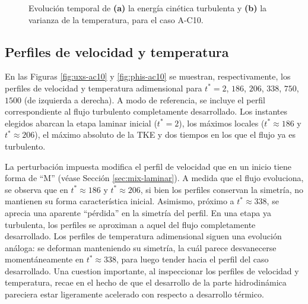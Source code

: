 \begin{figure}[H]
  \centering  
    
  \caption{Evolución temporal de \textbf{(a)} la energía cinética turbulenta y \textbf{(b)} la varianza de la temperatura, para el caso A-C10.}
  \label{fig:ac10-2}
\end{figure}

\subsection{Perfiles de velocidad y temperatura}

En las Figuras \ref{fig:uxs-ac10} y \ref{fig:phis-ac10} se muestran, respectivamente, los perfiles de velocidad y temperatura adimensional para $t^*=2$, $186$, $206$, $338$, $750$, $1500$ (de izquierda a derecha). A modo de referencia, se incluye el perfil correspondiente al flujo turbulento completamente desarrollado. Los instantes elegidos abarcan la etapa laminar inicial ($t^*=2$), los máximos locales ($t^* \approx 186$ y $t^* \approx 206$), el máximo absoluto de la TKE y dos tiempos en los que el flujo ya es turbulento.

La perturbación impuesta modifica el perfil de velocidad que en un inicio tiene forma de ``M'' (véase Sección \ref{sec:mix-laminar}). A medida que el flujo evoluciona, se observa que en $t^* \approx 186$ y $t^* \approx 206$, si bien los perfiles conservan la simetría, no mantienen su forma característica inicial. Asimismo, próximo a $t^* \approx 338$, se aprecia una aparente ``pérdida'' en la simetría del perfil. En una etapa ya turbulenta, los perfiles se aproximan a aquel del flujo completamente desarrollado. Los perfiles de temperatura adimensional siguen una evolución análoga: se deforman manteniendo su simetría, la cuál parece desvanecerse momentáneamente en $t^* \approx 338$, para luego tender hacia el perfil del caso desarrollado. Una cuestion importante, al inspeccionar los perfiles de velocidad y temperatura, recae en el hecho de que el desarrollo de la parte hidrodinámica pareciera estar ligeramente acelerado con respecto a desarrollo térmico.

